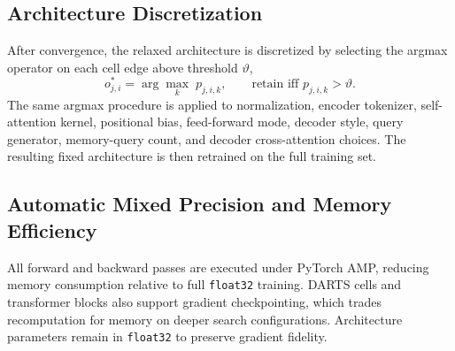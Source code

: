 \subsection{Architecture Discretization}
\label{sec:discretisation}

After convergence, the relaxed architecture is discretized by selecting the
argmax operator on each cell edge above threshold $\vartheta$,
%
\begin{equation}
    o^*_{j,i} = \arg\max_k\; p_{j,i,k},
    \qquad
    \text{retain iff } p_{j,i,k} > \vartheta.
    \label{eq:discretise}
\end{equation}
%
The same argmax procedure is applied to normalization, encoder tokenizer,
self-attention kernel, positional bias, feed-forward mode, decoder style,
query generator, memory-query count, and decoder cross-attention choices. The
resulting fixed architecture is then retrained on the full training set.

\subsection{Automatic Mixed Precision and Memory Efficiency}
\label{sec:amp}

All forward and backward passes are executed under PyTorch AMP, reducing
memory consumption relative to full \texttt{float32} training. DARTS cells and
transformer blocks also support gradient checkpointing, which trades
recomputation for memory on deeper search configurations. Architecture
parameters remain in \texttt{float32} to preserve gradient fidelity.

